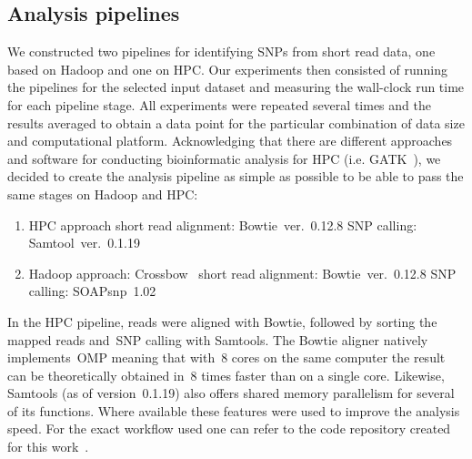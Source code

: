 \documentclass[11pt, oneside]{article}   	%
\begin{document}
\subsection{Analysis pipelines}
We constructed two pipelines for identifying SNPs from short read data, one based on Hadoop and one on HPC. Our experiments then consisted of running the pipelines for the selected input dataset and measuring the wall-clock run time for each pipeline stage. All experiments were repeated several times and the results averaged to obtain a data point for the particular combination of data size and computational platform. Acknowledging that there are different approaches and software for conducting bioinformatic analysis for HPC (i.e. GATK~\cite{gatk}), we decided to create the  analysis pipeline as simple as possible to be able to pass the same stages on Hadoop and HPC:


\begin{enumerate}
\item HPC approach
\subitem short read alignment: Bowtie~ver.~0.12.8
\subitem SNP calling: Samtool~ver.~0.1.19
\item Hadoop approach: Crossbow~\cite{crossbow}
\subitem short read alignment: Bowtie~ver.~0.12.8
\subitem SNP calling: SOAPsnp~1.02~\cite{soapsnp}
\end{enumerate}


In the HPC pipeline, reads were aligned with Bowtie, followed by sorting the mapped reads and~SNP calling with Samtools. The Bowtie aligner natively implements~OMP meaning that with~8 cores on the same computer the result can be theoretically obtained in~8 times faster than on a single core. Likewise, Samtools (as of version~0.1.19) also offers shared memory parallelism for several of its functions. Where available these features were used to improve the analysis speed. For the exact workflow used one can refer to the code repository created for this work~\cite{code_repo}.
\end{document}

